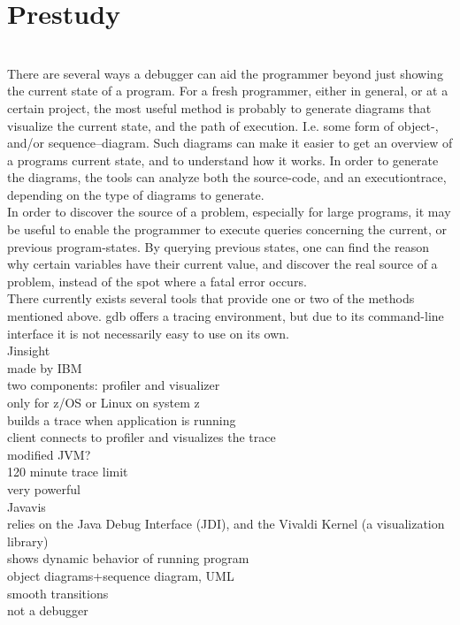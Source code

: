 \section{Prestudy}\label{Prestudy}
~\\
There are several ways a debugger can aid the programmer beyond just showing the current state of a program.
For a fresh programmer, either in general, or at a certain project, the most useful method is probably to generate diagrams that visualize the current state, and the path of execution.
I.e. some form of object-, and/or sequence--diagram.
Such diagrams can make it easier to get an overview of a programs current state, and to understand how it works.
In order to generate the diagrams, the tools can analyze both the source-code, and an \gls{executiontrace}, depending on the type of diagrams to generate.
~\\

In order to discover the source of a problem, especially for large programs, it may be useful to enable the programmer to execute queries concerning the current, or previous program-states.
By querying previous states, one can find the reason why certain variables have their current value, and discover the real source of a problem, instead of the spot where a fatal error occurs.
~\\

There currently exists several tools that provide one or two of the methods mentioned above. \Gls{gdb} offers a tracing environment, but due to its command-line interface %
it is not necessarily easy to use on its own.
~\\


Jinsight\\%
	made by IBM\\
	two components: profiler and visualizer\\
	only for z/OS or Linux on system z\\
	builds a trace when application is running\\
	client connects to profiler and visualizes the trace\\
	modified JVM?\\
	120 minute trace limit\\
	very powerful\\

Javavis\\
	relies on the Java Debug Interface (JDI), and the Vivaldi Kernel (a visualization library)\\
	shows dynamic behavior of running program\\
	object diagrams+sequence diagram, UML\\
	smooth transitions\\
	not a debugger\\
	
